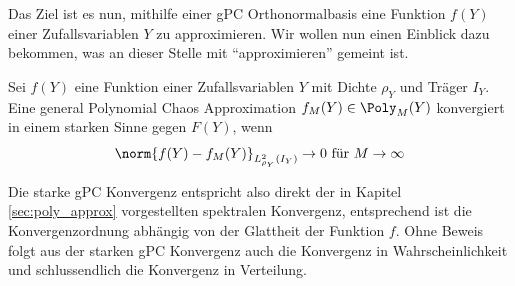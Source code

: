 Das Ziel ist es nun, mithilfe einer gPC Orthonormalbasis eine Funktion $f(Y)$ einer Zufallsvariablen $Y$ zu approximieren. Wir wollen nun einen Einblick dazu bekommen, was an dieser Stelle mit "`approximieren"' gemeint ist.
\begin{mathdef}
Sei $f(Y)$ eine Funktion einer Zufallsvariablen $Y$ mit Dichte $\rho_Y$ und Träger $I_Y$. Eine general Polynomial Chaos Approximation $f_M(Y)\in\Poly_M(Y)$ konvergiert in einem starken Sinne gegen $F(Y)$, wenn \[\norm{f(Y)-f_M(Y)}_{L_{\rho_Y}^2(I_Y)}\to 0\text{ für }{M\to\infty}\]
\end{mathdef}
Die starke gPC Konvergenz entspricht also direkt der in Kapitel \ref{sec:poly_approx} vorgestellten spektralen Konvergenz, entsprechend ist die Konvergenzordnung abhängig von der Glattheit der Funktion $f$. Ohne Beweis folgt aus der starken gPC Konvergenz auch die Konvergenz in Wahrscheinlichkeit und schlussendlich die Konvergenz in Verteilung.

